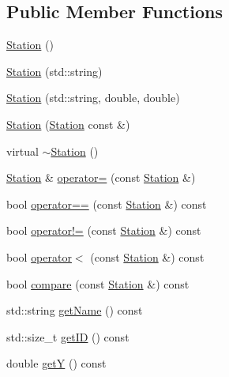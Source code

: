 \subsection*{Public Member Functions}
\begin{DoxyCompactItemize}
\item 
\mbox{\hyperlink{classanen_sta_1_1_station_a73d335726aad1d844d81cda6d9fd74e6}{Station}} ()
\item 
\mbox{\hyperlink{classanen_sta_1_1_station_aeeba2cddaa328abff85cebfa5898b988}{Station}} (std\+::string)
\item 
\mbox{\hyperlink{classanen_sta_1_1_station_a1ebec6ab0f696fcbe3b2fdabf0e08410}{Station}} (std\+::string, double, double)
\item 
\mbox{\hyperlink{classanen_sta_1_1_station_aadb65bfb700ad2aee7dd4e7f62e40613}{Station}} (\mbox{\hyperlink{classanen_sta_1_1_station}{Station}} const \&)
\item 
virtual \mbox{\hyperlink{classanen_sta_1_1_station_a00434e79e8ee7f4ebd6d3b631dde5ac0}{$\sim$\+Station}} ()
\item 
\mbox{\hyperlink{classanen_sta_1_1_station}{Station}} \& \mbox{\hyperlink{classanen_sta_1_1_station_abaf887b87628c2bcd7e0af8626a4a1a4}{operator=}} (const \mbox{\hyperlink{classanen_sta_1_1_station}{Station}} \&)
\item 
bool \mbox{\hyperlink{classanen_sta_1_1_station_adae415f0267986c0056899ff4104cd5e}{operator==}} (const \mbox{\hyperlink{classanen_sta_1_1_station}{Station}} \&) const
\item 
bool \mbox{\hyperlink{classanen_sta_1_1_station_ac72abea3ad4afc0155b34af7d3c98bd8}{operator!=}} (const \mbox{\hyperlink{classanen_sta_1_1_station}{Station}} \&) const
\item 
bool \mbox{\hyperlink{classanen_sta_1_1_station_ad49b12012cb13c9f806587d9aa4c6fc9}{operator$<$}} (const \mbox{\hyperlink{classanen_sta_1_1_station}{Station}} \&) const
\item 
bool \mbox{\hyperlink{classanen_sta_1_1_station_a92f492a4766127e6ffbe993f0873708c}{compare}} (const \mbox{\hyperlink{classanen_sta_1_1_station}{Station}} \&) const
\item 
std\+::string \mbox{\hyperlink{classanen_sta_1_1_station_ac823ae175ec0e2baff462ed9612c7bae}{get\+Name}} () const
\item 
std\+::size\+\_\+t \mbox{\hyperlink{classanen_sta_1_1_station_a69be6c90e4613e4166651ff6e67cfba2}{get\+ID}} () const
\item 
double \mbox{\hyperlink{classanen_sta_1_1_station_aadddb2db193456d14bae16dbf2b8259f}{getY}} () const

\end{DoxyCompactItemize}
